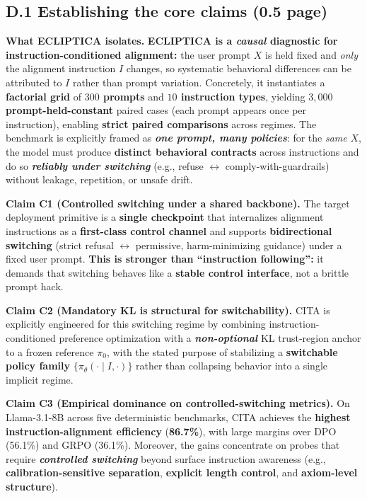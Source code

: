 \vspace{-0.35em}
\subsection{D.1 Establishing the core claims (0.5 page)}
\vspace{-0.2em}

\noindent\textbf{What ECLIPTICA isolates.}
\textbf{ECLIPTICA is a \emph{causal} diagnostic for instruction-conditioned alignment:} the user prompt $X$ is held fixed and \emph{only} the alignment instruction $I$ changes, so systematic behavioral differences can be attributed to $I$ rather than prompt variation. Concretely, it instantiates a \textbf{factorial grid} of \textbf{$300$ prompts} and \textbf{$10$ instruction types}, yielding \textbf{$3{,}000$ prompt-held-constant} paired cases (each prompt appears once per instruction), enabling \textbf{strict paired comparisons} across regimes. The benchmark is explicitly framed as \textbf{\emph{one prompt, many policies}}: for the \emph{same} $X$, the model must produce \textbf{distinct behavioral contracts} across instructions and do so \textbf{\emph{reliably under switching}} (e.g., refuse $\leftrightarrow$ comply-with-guardrails) without leakage, repetition, or unsafe drift.

\noindent\textbf{Claim C1 (Controlled switching under a shared backbone).}
The target deployment primitive is a \textbf{single checkpoint} that internalizes alignment instructions as a \textbf{first-class control channel} and supports \textbf{bidirectional switching} (strict refusal $\leftrightarrow$ permissive, harm-minimizing guidance) under a fixed user prompt. \textbf{This is stronger than ``instruction following'':} it demands that switching behaves like a \textbf{stable control interface}, not a brittle prompt hack.

\noindent\textbf{Claim C2 (Mandatory KL is structural for switchability).}
CITA is explicitly engineered for this switching regime by combining instruction-conditioned preference optimization with a \textbf{\emph{non-optional}} KL trust-region anchor to a frozen reference $\pi_0$, with the stated purpose of stabilizing a \textbf{switchable policy family} $\{\pi_\theta(\cdot\mid I,\cdot)\}$ rather than collapsing behavior into a single implicit regime.

\noindent\textbf{Claim C3 (Empirical dominance on controlled-switching metrics).}
On Llama-3.1-8B across five deterministic benchmarks, CITA achieves the \textbf{highest instruction-alignment efficiency} (\textbf{86.7\%}), with large margins over DPO (56.1\%) and GRPO (36.1\%). Moreover, the gains concentrate on probes that require \textbf{\emph{controlled switching}} beyond surface instruction awareness (e.g., \textbf{calibration-sensitive separation}, \textbf{explicit length control}, and \textbf{axiom-level structure}).

